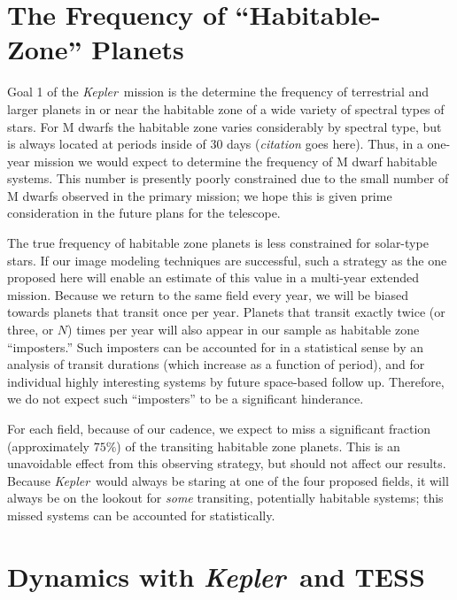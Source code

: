 \documentclass[12pt, preprint]{aastex}
\newcommand{\observatory}[1]{\textsl{#1}}
\newcommand{\kepler}{\observatory{Kepler}}
\newcommand{\Kepler}{\kepler}
\begin{document}
\section{The Frequency of ``Habitable-Zone'' Planets}
\label{HZ}
Goal 1 of the \Kepler\ mission is the determine the frequency of terrestrial 
 and larger planets in or near the habitable zone of a wide variety of 
 spectral types of stars. 
For M dwarfs the habitable zone varies considerably by spectral type,
 but is always located at periods inside of 30 days (\emph{citation} goes 
 here).
Thus, in a one-year mission we would expect to determine the frequency of 
 M dwarf habitable systems. This number is presently poorly constrained due 
 to the small number of M dwarfs observed in the primary mission; we hope
 this is given prime consideration in the future plans for the telescope.

The true frequency of habitable zone planets is less constrained for solar-type 
 stars.
If our image modeling techniques are successful, such a strategy as the 
 one proposed here will enable an estimate of this value in a multi-year 
 extended mission. 
Because we return to the same field every year, we will be biased towards 
 planets that transit once per year. 
Planets that transit exactly twice (or three, or $N$) times per year will 
 also appear in our sample as habitable zone ``imposters.'' 
Such imposters can be accounted for in a statistical sense by an analysis of 
 transit durations (which increase as a function of period), and for 
 individual highly interesting systems by future space-based follow up. 
Therefore, we do not expect such ``imposters'' to be a significant hinderance.

For each field, because of our cadence, we expect to miss a significant 
 fraction (approximately $75\%$) of the transiting habitable zone planets. 
This is an unavoidable effect from this observing strategy, but should 
 not affect our results. 
Because \Kepler\ would always be staring at one of the four proposed fields, 
 it will always be on the lookout for \emph{some} transiting, potentially 
 habitable systems; this missed systems can be accounted for statistically.


\section{Dynamics with \Kepler\ and TESS}
\label{Dynamics}
\end{document}
